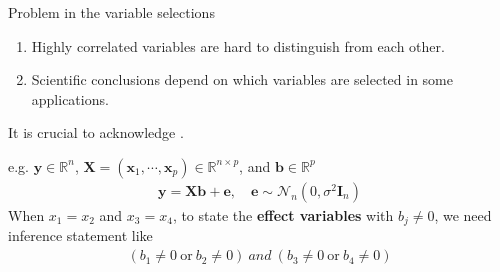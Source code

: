\documentclass[10pt]{beamer}
\begin{document}
\begin{frame}{Problem in the variable selections}
    \begin{enumerate}
        \item Highly correlated variables are hard to distinguish from each other.
        \item Scientific conclusions depend on which variables are selected in some applications.
    \end{enumerate}
    \medskip
    \begin{center}
        \large
        It is crucial to acknowledge 
        .
    \end{center}
    \bigskip
    \begin{framed}
        e.g. $\bm{y}\in\mathbb{R}^n$, $\bm{X}=(\bm{x}_1,\cdots,\bm{x}_p)\in\mathbb{R}^{n\times p}$, and $\bm{b}\in\mathbb{R}^{p}$
        \begin{gather}
            \bm{y} = \bm{X}\bm{b} + \bm{e}, \quad\bm{e}\sim\mathcal{N}_n(0,\sigma^2\bm{I}_n)\label{eq:toyexample}
        \end{gather}
        When $x_1=x_2$ and $x_3=x_4$, to state the \textbf{effect variables} with $b_j\neq 0$,
        we need inference statement like 
        \begin{gather}
            (b_1\neq 0\ \text{or} \ b_2\neq 0)\ and \ (b_3\neq 0\ \text{or}\ b_4\neq 0) \label{eq:targetstatement}
        \end{gather}
    \end{framed}
\end{frame}

\end{document}
